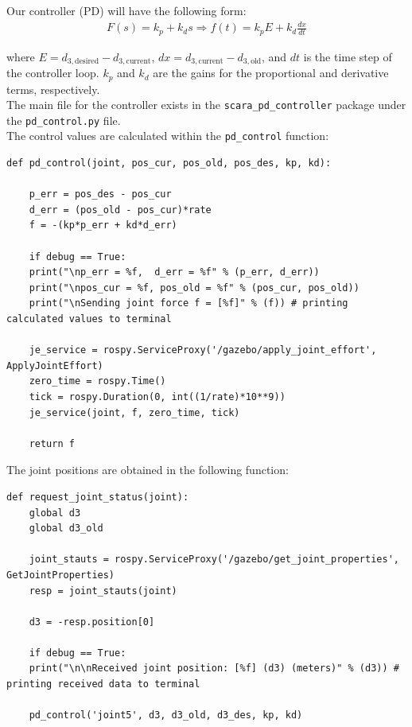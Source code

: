 \documentclass[10pt]{article}
\begin{document}
\begin{enumerate}
	Our controller (PD) will have the following form:
	\begin{align*}
		F(s) = k_p + k_d s \Rightarrow f(t) = k_p E + k_d \frac{dx}{dt}
	\end{align*}
	
	where $E = d_{3,\text{desired}} - d_{3,\text{current}}$, $dx = d_{3,\text{current}} - d_{3,\text{old}}$, and $dt$ is the time step of the controller loop. $k_p$ and $k_d$ are the gains for the proportional and derivative terms, respectively.
	\\
	
	The main file for the controller exists in the \texttt{scara\_pd\_controller} package under the \texttt{pd\_control.py} file.
	\\
	
	The control values are calculated within the \texttt{pd\_control} function:
	
\begin{lstlisting}[style=Matlab-editor,basicstyle=\mlttfamily,escapechar=`]
def pd_control(joint, pos_cur, pos_old, pos_des, kp, kd):
	
	p_err = pos_des - pos_cur
	d_err = (pos_old - pos_cur)*rate
	f = -(kp*p_err + kd*d_err)
	
	if debug == True:
	print("\np_err = %f,  d_err = %f" % (p_err, d_err))
	print("\npos_cur = %f, pos_old = %f" % (pos_cur, pos_old))
	print("\nSending joint force f = [%f]" % (f)) # printing calculated values to terminal
	
	je_service = rospy.ServiceProxy('/gazebo/apply_joint_effort', ApplyJointEffort)
	zero_time = rospy.Time()
	tick = rospy.Duration(0, int((1/rate)*10**9))
	je_service(joint, f, zero_time, tick)
	
	return f
\end{lstlisting} 

	The joint positions are obtained in the following function:
	
\begin{lstlisting}[style=Matlab-editor,basicstyle=\mlttfamily,escapechar=`]
def request_joint_status(joint):
	global d3
	global d3_old
	
	joint_stauts = rospy.ServiceProxy('/gazebo/get_joint_properties', GetJointProperties)
	resp = joint_stauts(joint)
	
	d3 = -resp.position[0]
	
	if debug == True:
	print("\n\nReceived joint position: [%f] (d3) (meters)" % (d3)) # printing received data to terminal
	
	pd_control('joint5', d3, d3_old, d3_des, kp, kd)
	

\end{lstlisting}
\end{enumerate}
\end{document}

